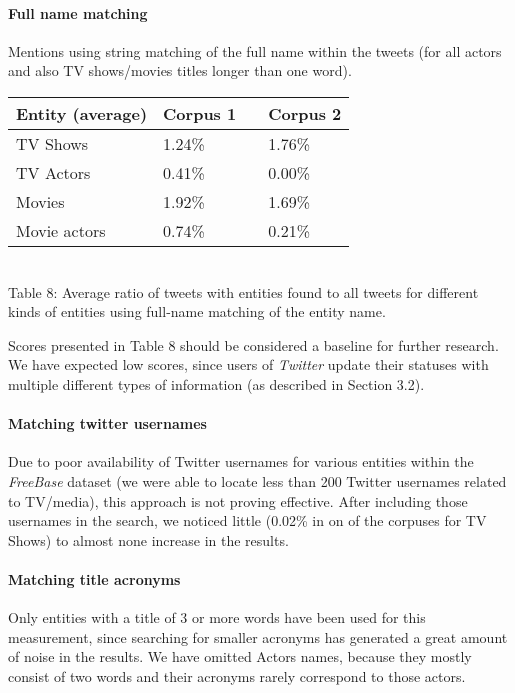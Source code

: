 \paragraph{Full name matching}
Mentions using string matching of the full name within the tweets (for all actors and also TV shows/movies titles longer
than one word).

\begin{center}
  \begin{tabular}{ | p{4cm} | p{2cm} | p{1cm}| p{2cm} | } \hline
    Entity (average) & Corpus 1 & & Corpus 2 \\ \hline
    TV Shows & 1.24\% & & 1.76\% \\ \hline
    TV Actors & 0.41\% & & 0.00\% \\ \hline
    Movies & 1.92\% & & 1.69\% \\ \hline
    Movie actors & 0.74\% & & 0.21\% \\ \hline
  \end{tabular} \\
  Table 8: Average ratio of tweets with entities found to all tweets for different kinds of entities using full-name matching of the entity name. \\
\end{center}

Scores presented in Table 8 should be considered a baseline for further research. We have expected low scores, since users of \textit{Twitter} update their statuses with multiple different types of information (as described in Section 3.2).

\paragraph{Matching twitter usernames}
Due to poor availability of Twitter usernames for various entities within the \textit{FreeBase} dataset (we were able to locate less than 200 Twitter
usernames related to TV/media), this approach is not proving effective. After including those usernames in the search,
we noticed little (0.02\% in on of the corpuses for TV Shows) to almost none increase in the results.

\paragraph{Matching title acronyms}
Only entities with a title of 3 or more words have been used for this measurement, since searching
for smaller acronyms has generated a great amount of noise in the results. We have omitted Actors names, because
they mostly consist of two words and their acronyms rarely correspond to those actors.

